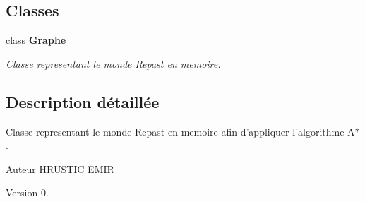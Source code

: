 \subsection*{Classes}
\begin{DoxyCompactItemize}
\item 
class {\bf Graphe}
\begin{DoxyCompactList}\small\item\em Classe representant le monde Repast en memoire. \end{DoxyCompactList}\end{DoxyCompactItemize}


\subsection{Description détaillée}
Classe representant le monde Repast en memoire afin d'appliquer l'algorithme A$\ast$. \begin{DoxyAuthor}{Auteur}
H\-R\-U\-S\-T\-I\-C E\-M\-I\-R 
\end{DoxyAuthor}
\begin{DoxyVersion}{Version}
0. 
\end{DoxyVersion}
